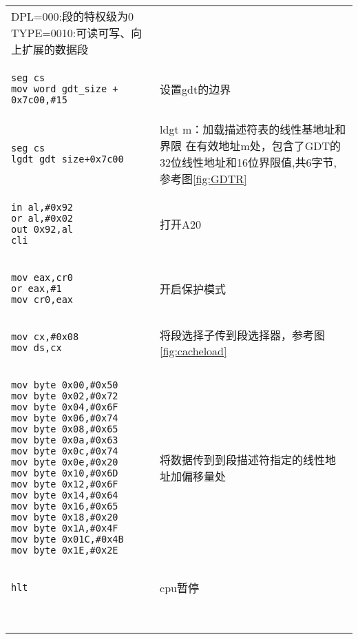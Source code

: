 \documentclass{ctexart}
\begin{document}
\begin{longtable}{ |*{1}{m{.55\paperwidth}} | *{1}{m{.40\paperwidth}} |}
      DPL=000:段的特权级为0    \newline
      TYPE=0010:可读可写、向上扩展的数据段    \\
      \cline{2-2}
      \begin{verbatim}
seg cs
mov word gdt_size + 0x7c00,#15
      \end{verbatim} 
      & 设置gdt的边界     \\
      \cline{2-2}
      \begin{verbatim}
seg cs
lgdt gdt_size+0x7c00
      \end{verbatim}   
      &       
      \colorbox{gray!80}{\Large ldgt m}：加载描述符表的线性基地址和界限   \newline
      在有效地址m处，包含了GDT的32位线性地址和16位界限值,共6字节,参考图\ref{fig:GDTR}  \\
      \cline{2-2}
      \begin{verbatim}
in al,#0x92 
or al,#0x02
out 0x92,al 
cli
      \end{verbatim}   
      & 打开A20 \\
      \cline{2-2}
      \begin{verbatim}
mov eax,cr0
or eax,#1
mov cr0,eax 
      \end{verbatim}   
      & 开启保护模式 \\
      \cline{2-2}
      \begin{verbatim}
mov cx,#0x08
mov ds,cx
      \end{verbatim}   
      & 将段选择子传到段选择器，参考图\ref{fig:cacheload} \\
      \cline{2-2}
      \begin{verbatim}
mov byte 0x00,#0x50
mov byte 0x02,#0x72
mov byte 0x04,#0x6F
mov byte 0x06,#0x74
mov byte 0x08,#0x65
mov byte 0x0a,#0x63
mov byte 0x0c,#0x74
mov byte 0x0e,#0x20
mov byte 0x10,#0x6D
mov byte 0x12,#0x6F
mov byte 0x14,#0x64
mov byte 0x16,#0x65
mov byte 0x18,#0x20
mov byte 0x1A,#0x4F
mov byte 0x01C,#0x4B
mov byte 0x1E,#0x2E
      \end{verbatim}    
      & 将数据传到到段描述符指定的线性地址加偏移量处 \\
      \cline{2-2}
      \begin{verbatim}
hlt
      \end{verbatim}   
      & cpu暂停  \\
      \cline{2-2}
      \begin{verbatim}

\end{verbatim}
\end{longtable}
\end{document}
